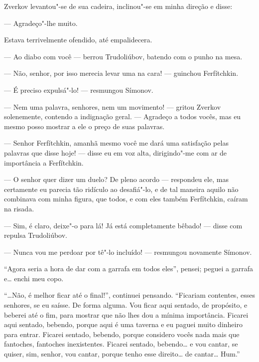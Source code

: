 Zverkov levantou"-se de sua cadeira, inclinou"-se em minha direção e
disse:

--- Agradeço"-lhe muito.

Estava terrivelmente ofendido, até empalidecera.

--- Ao diabo com você --- berrou Trudoliúbov, batendo com o punho na mesa.

--- Não, senhor, por isso merecia levar uma na cara! --- guinchou
Ferfítchkin.

--- É preciso expulsá"-lo! --- resmungou Símonov.

--- Nem uma palavra, senhores, nem um movimento! --- gritou Zverkov
solenemente, contendo a indignação geral. --- Agradeço a todos vocês, mas
eu mesmo posso mostrar a ele o preço de suas palavras.

--- Senhor Ferfítchkin, amanhã mesmo você me dará uma satisfação pelas
palavras que disse hoje! --- disse eu em voz alta, dirigindo"-me com ar de
importância a Ferfítchkin.

--- O senhor quer dizer um duelo? De pleno acordo --- respondeu ele, mas
certamente eu parecia tão ridículo ao desafiá"-lo, e de tal maneira
aquilo não combinava com minha figura, que todos, e com eles também
Ferfítchkin, caíram na risada.

--- Sim, é claro, deixe"-o para lá! Já está completamente bêbado! --- disse
com repulsa Trudoliúbov.

--- Nunca vou me perdoar por tê"-lo incluído! --- resmungou novamente
Símonov.

``Agora seria a hora de dar com a garrafa em todos eles'', pensei; peguei
a garrafa e\ldots{} enchi meu copo.

``\ldots{}Não, é melhor ficar até o final!'', continuei pensando. ``Ficariam
contentes, esses senhores, se eu saísse. De forma alguma. Vou ficar
aqui sentado, de propósito, e beberei até o fim, para mostrar que não
lhes dou a mínima importância. Ficarei aqui sentado, bebendo, porque
aqui é uma taverna e eu paguei muito dinheiro para entrar. Ficarei
sentado, bebendo, porque considero vocês nada mais que fantoches,
fantoches inexistentes. Ficarei sentado, bebendo\ldots{} e vou cantar, se
quiser, sim, senhor, vou cantar, porque tenho esse direito\ldots{} de
cantar\ldots{} Hum.''

